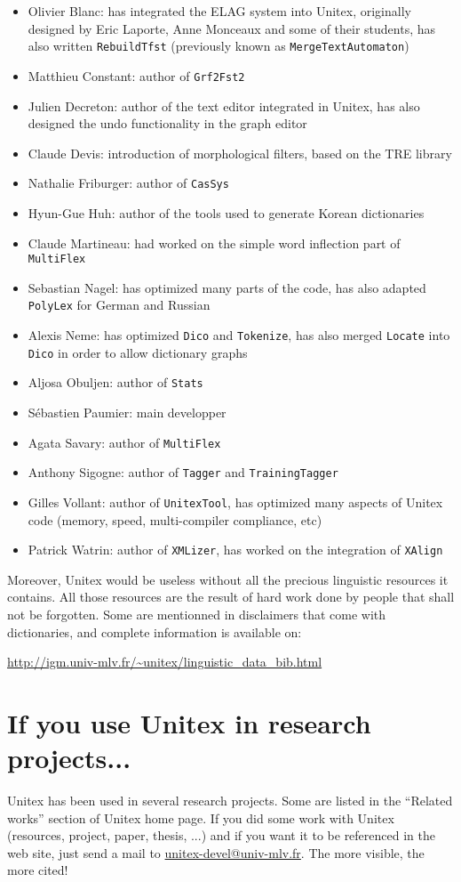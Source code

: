 \begin{itemize}
    \item Olivier Blanc: has integrated the ELAG system into Unitex, originally
    designed by Eric Laporte, Anne Monceaux and some of their students, has
    also written \verb+RebuildTfst+ (previously known as \verb+MergeTextAutomaton+)
    \item Matthieu Constant: author of \verb+Grf2Fst2+
    \item Julien Decreton: author of the text editor integrated in Unitex,
    has also designed the undo functionality in the graph editor
    \item Claude Devis: introduction of morphological filters, 
    based on the TRE library
    \item Nathalie Friburger: author of \verb+CasSys+
    \item Hyun-Gue Huh: author of the tools used to
    generate Korean dictionaries
    \item Claude Martineau: had worked on the simple word inflection part of
    \verb+MultiFlex+
    \item Sebastian Nagel: has optimized many parts of the code, has also
    adapted \verb+PolyLex+ for German and Russian
    \item Alexis Neme: has optimized \verb+Dico+ and \verb+Tokenize+, has also
    merged \verb+Locate+ into \verb+Dico+ in order to allow dictionary graphs 
    \item Aljosa Obuljen: author of \verb+Stats+
    \item S\'ebastien Paumier: main developper
    \item Agata Savary: author of \verb+MultiFlex+
    \item Anthony Sigogne: author of \verb+Tagger+ and \verb+TrainingTagger+
    \item Gilles Vollant: author of \verb+UnitexTool+, has optimized many
    aspects of Unitex code (memory, speed, multi-compiler compliance, etc)
    \item Patrick Watrin: author of \verb+XMLizer+, has worked on the
    integration of \verb+XAlign+
\end{itemize}

\bigskip
\noindent Moreover, Unitex would be useless without all the precious linguistic
resources it contains. All those resources are the result of hard work done
by people that shall not be forgotten. Some are mentionned in disclaimers that
come with dictionaries, and complete information is available on:

\bigskip
\noindent \url{http://igm.univ-mlv.fr/~unitex/linguistic_data_bib.html}


\section*{If you use Unitex in research projects...}
Unitex has been used in several research projects. Some are listed in the
``Related works'' section of Unitex home page. If you did some work with Unitex
(resources, project, paper, thesis, ...) and if you want it to be referenced in
the web site, just send a mail to \url{unitex-devel@univ-mlv.fr}. The more visible,
the more cited!
